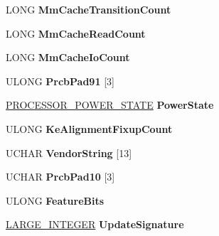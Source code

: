 \begin{DoxyCompactItemize}
\item 
\mbox{\label{struct___k_p_r_c_b_adf5b8827f9dc215d847fcd1ad67de657}} 
L\+O\+NG {\bfseries Mm\+Cache\+Transition\+Count}
\item 
\mbox{\label{struct___k_p_r_c_b_a752aff943b9c757e8c87f2cd00943ba6}} 
L\+O\+NG {\bfseries Mm\+Cache\+Read\+Count}
\item 
\mbox{\label{struct___k_p_r_c_b_a53f96a22c013f3b12bc86cad50d59323}} 
L\+O\+NG {\bfseries Mm\+Cache\+Io\+Count}
\item 
\mbox{\label{struct___k_p_r_c_b_a5f72e09f9a1a959f482e5cfc424eec8f}} 
U\+L\+O\+NG {\bfseries Prcb\+Pad91} \mbox{[}3\mbox{]}
\item 
\mbox{\label{struct___k_p_r_c_b_a1079ffdf326a745db917a5e021506702}} 
\hyperlink{struct___p_r_o_c_e_s_s_o_r___p_o_w_e_r___s_t_a_t_e}{P\+R\+O\+C\+E\+S\+S\+O\+R\+\_\+\+P\+O\+W\+E\+R\+\_\+\+S\+T\+A\+TE} {\bfseries Power\+State}
\item 
\mbox{\label{struct___k_p_r_c_b_af5b5738d2956925f61a7aaecc9bcc2b1}} 
U\+L\+O\+NG {\bfseries Ke\+Alignment\+Fixup\+Count}
\item 
\mbox{\label{struct___k_p_r_c_b_a284fd8d6ddf0bc61b14c5b80489506b9}} 
U\+C\+H\+AR {\bfseries Vendor\+String} \mbox{[}13\mbox{]}
\item 
\mbox{\label{struct___k_p_r_c_b_a0fa556b75ab3f11a7045946e4747afb8}} 
U\+C\+H\+AR {\bfseries Prcb\+Pad10} \mbox{[}3\mbox{]}
\item 
\mbox{\label{struct___k_p_r_c_b_a9f2571b8e8d445d64a6b98218f2f7329}} 
U\+L\+O\+NG {\bfseries Feature\+Bits}
\item 
\mbox{\label{struct___k_p_r_c_b_ade77e8f1d8ee31d94d792d80f8393431}} 
\hyperlink{union___l_a_r_g_e___i_n_t_e_g_e_r}{L\+A\+R\+G\+E\+\_\+\+I\+N\+T\+E\+G\+ER} {\bfseries Update\+Signature}
\item 
\mbox{\label{struct___k_p_r_c_b_a5d6d40804a374a0e37ff12c9b8d96071}} 

\end{DoxyCompactItemize}
